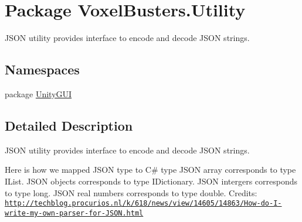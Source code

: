 \hypertarget{namespace_voxel_busters_1_1_utility}{}\section{Package Voxel\+Busters.\+Utility}
\label{namespace_voxel_busters_1_1_utility}


J\+S\+O\+N utility provides interface to encode and decode J\+S\+O\+N strings.  


\subsection*{Namespaces}
\begin{DoxyCompactItemize}
\item 
package \hyperlink{namespace_voxel_busters_1_1_utility_1_1_unity_g_u_i}{Unity\+G\+U\+I}
\end{DoxyCompactItemize}


\subsection{Detailed Description}
J\+S\+O\+N utility provides interface to encode and decode J\+S\+O\+N strings. 

Here is how we mapped J\+S\+O\+N type to C\# type J\+S\+O\+N array corresponds to type I\+List. J\+S\+O\+N objects corresponds to type I\+Dictionary. J\+S\+O\+N intergers corresponds to type long. J\+S\+O\+N real numbers corresponds to type double. Credits\+: \href{http://techblog.procurios.nl/k/618/news/view/14605/14863/How-do-I-write-my-own-parser-for-JSON.html}{\tt http\+://techblog.\+procurios.\+nl/k/618/news/view/14605/14863/\+How-\/do-\/\+I-\/write-\/my-\/own-\/parser-\/for-\/\+J\+S\+O\+N.\+html}  